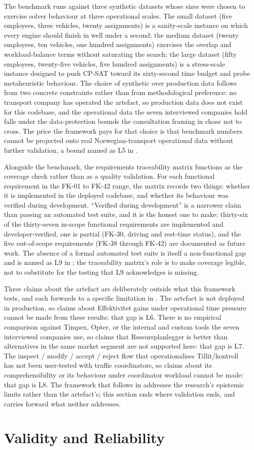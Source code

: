 The benchmark runs against three synthetic datasets whose sizes were chosen to exercise solver behaviour at three operational scales. The small dataset (five employees, three vehicles, twenty assignments) is a sanity-scale instance on which every engine should finish in well under a second; the medium dataset (twenty employees, ten vehicles, one hundred assignments) exercises the overlap and workload-balance terms without saturating the search; the large dataset (fifty employees, twenty-five vehicles, five hundred assignments) is a stress-scale instance designed to push CP-SAT toward its sixty-second time budget and probe metaheuristic behaviour. The choice of synthetic over production data follows from two concrete constraints rather than from methodological preference: no transport company has operated the artefact, so production data does not exist for this codebase, and the operational data the seven interviewed companies hold falls under the data-protection bounds the consultation framing in  chose not to cross. The price the framework pays for that choice is that benchmark numbers cannot be projected onto real Norwegian-transport operational data without further validation, a bound named as L5 in .

Alongside the benchmark, the requirements traceability matrix functions as the coverage check rather than as a quality validation. For each functional requirement in the FK-01 to FK-42 range, the matrix records two things: whether it is implemented in the deployed codebase, and whether its behaviour was verified during development. ``Verified during development'' is a narrower claim than passing an automated test suite, and it is the honest one to make: thirty-six of the thirty-seven in-scope functional requirements are implemented and developer-verified, one is partial (FK-30, driving and rest-time status), and the five out-of-scope requirements (FK-38 through FK-42) are documented as future work. The absence of a formal automated test suite is itself a non-functional gap and is named as L9 in ; the traceability matrix's role is to make coverage legible, not to substitute for the testing that L9 acknowledges is missing.

Three claims about the artefact are deliberately outside what this framework tests, and each forwards to a specific limitation in . The artefact is not deployed in production, so claims about Effektivitet gains under operational time pressure cannot be made from these results: that gap is L6. There is no empirical comparison against Timpex, Opter, or the internal and custom tools the seven interviewed companies use, so claims that Ressursplanlegger is better than alternatives in the same market segment are not supported here: that gap is L7. The inspect / modify / accept / reject flow that operationalises Tillit/kontroll has not been user-tested with traffic coordinators, so claims about its comprehensibility or its behaviour under coordinator workload cannot be made: that gap is L8. The framework that follows in  addresses the research's epistemic limits rather than the artefact's; this section ends where validation ends, and  carries forward what neither addresses.


\section{Validity and Reliability}
\label{sec:validity}
